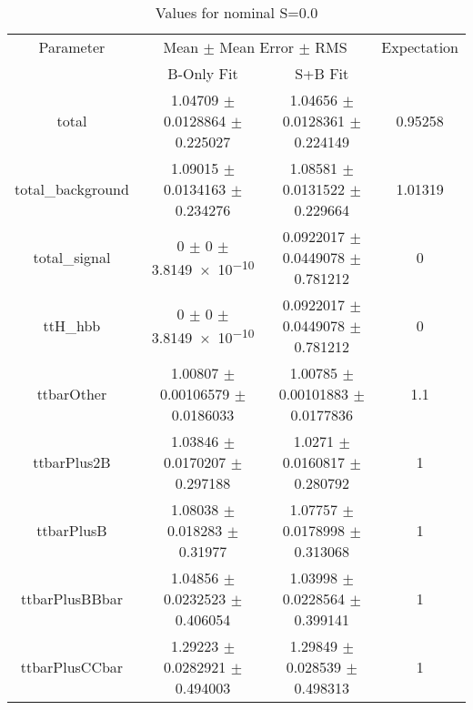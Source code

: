 \begin{table}
\centering
\caption{Values for nominal S=0.0}
\begin{tabular}{cccc}
\toprule
Parameter & \multicolumn{2}{c}{Mean $\pm$ Mean Error $\pm$ RMS} & Expectation\\
 & B-Only Fit & S+B Fit & \\
\midrule
total & \num{1.04709} $\pm$ \num{0.0128864} $\pm$ \num{0.225027} & \num{1.04656} $\pm$ \num{0.0128361} $\pm$ \num{0.224149} & \num{0.95258}\\
total\_background & \num{1.09015} $\pm$ \num{0.0134163} $\pm$ \num{0.234276} & \num{1.08581} $\pm$ \num{0.0131522} $\pm$ \num{0.229664} & \num{1.01319}\\
total\_signal & \num{0} $\pm$ \num{0} $\pm$ \num{3.8149e-10} & \num{0.0922017} $\pm$ \num{0.0449078} $\pm$ \num{0.781212} & \num{0}\\
ttH\_hbb & \num{0} $\pm$ \num{0} $\pm$ \num{3.8149e-10} & \num{0.0922017} $\pm$ \num{0.0449078} $\pm$ \num{0.781212} & \num{0}\\
ttbarOther & \num{1.00807} $\pm$ \num{0.00106579} $\pm$ \num{0.0186033} & \num{1.00785} $\pm$ \num{0.00101883} $\pm$ \num{0.0177836} & \num{1.1}\\
ttbarPlus2B & \num{1.03846} $\pm$ \num{0.0170207} $\pm$ \num{0.297188} & \num{1.0271} $\pm$ \num{0.0160817} $\pm$ \num{0.280792} & \num{1}\\
ttbarPlusB & \num{1.08038} $\pm$ \num{0.018283} $\pm$ \num{0.31977} & \num{1.07757} $\pm$ \num{0.0178998} $\pm$ \num{0.313068} & \num{1}\\
ttbarPlusBBbar & \num{1.04856} $\pm$ \num{0.0232523} $\pm$ \num{0.406054} & \num{1.03998} $\pm$ \num{0.0228564} $\pm$ \num{0.399141} & \num{1}\\
ttbarPlusCCbar & \num{1.29223} $\pm$ \num{0.0282921} $\pm$ \num{0.494003} & \num{1.29849} $\pm$ \num{0.028539} $\pm$ \num{0.498313} & \num{1}\\
\bottomrule
\end{tabular}
\end{table}